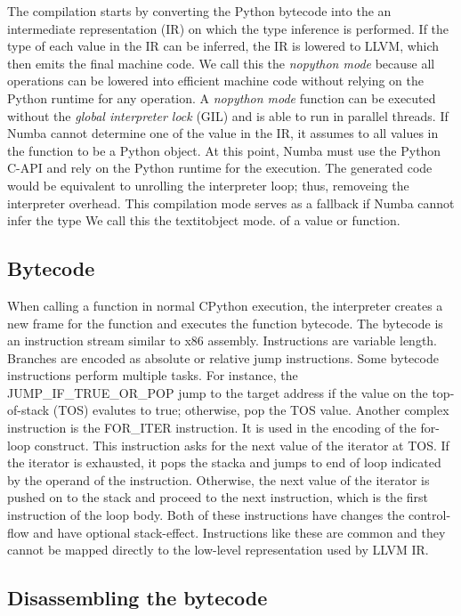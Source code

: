 \documentclass{acm_proc_article-sp}
\begin{document}
The compilation starts by converting the Python bytecode into the an
intermediate representation (IR) on which the type inference
is performed. If the type of each value in the IR can be inferred, the IR is
lowered to LLVM, which then emits the final machine code.  We call this the
\textit{nopython mode} because all operations can be lowered into efficient
machine code without relying on the Python runtime for any operation.
A \textit{nopython mode} function can be executed without the \textit{global
interpreter lock} (GIL) and is able to run in parallel threads.
If Numba cannot determine one of the value in the IR,
it assumes to all values in the function to be a Python object. At this point,
Numba must use the Python C-API and rely on the Python runtime for the
execution. The generated code would be equivalent to unrolling the interpreter
loop; thus, removeing the interpreter overhead.
This compilation mode serves as a fallback if Numba cannot infer the type
We call this the textit{object mode}.
of a value or function.

\subsection{Bytecode}

When calling a function in normal CPython execution, the interpreter creates
a new frame for the function and executes the function bytecode.
The bytecode is an instruction stream similar to x86 assembly.
Instructions are variable length. Branches are encoded as absolute or relative
jump instructions. Some bytecode instructions perform multiple tasks.
For instance, the JUMP\_IF\_TRUE\_OR\_POP jump to the
target address if the value on the top-of-stack (TOS) evalutes to true;
otherwise, pop the TOS value.  Another complex instruction is the FOR\_ITER
instruction.  It is used in the encoding of the for-loop construct.
This instruction asks for the next value of the iterator at TOS.
If the iterator is exhausted, it pops the stacka and jumps to end of loop
indicated by the operand of the instruction.  Otherwise, the next value of the
iterator is pushed on to the stack and proceed to the next instruction, which
is the first instruction of the loop body. Both of these instructions have
changes the control-flow and have optional stack-effect. \cite{pythondoc:dis}
Instructions like these are common and they cannot be mapped directly to
the low-level representation used by LLVM IR.

\subsection{Disassembling the bytecode}
\end{document}
